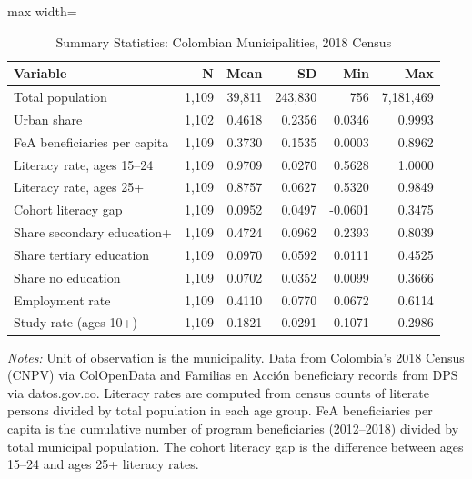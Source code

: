 \begin{table}[H]
\centering
\caption{Summary Statistics: Colombian Municipalities, 2018 Census}
\label{tab:summary}
\begin{threeparttable}
\begin{adjustbox}{max width=\textwidth}
\begin{tabular}{lrrrrr}
\toprule
Variable & N & Mean & SD & Min & Max \\
\midrule
Total population & 1,109 & 39,811 & 243,830 & 756 & 7,181,469 \\
Urban share & 1,102 & 0.4618 & 0.2356 & 0.0346 & 0.9993 \\
FeA beneficiaries per capita & 1,109 & 0.3730 & 0.1535 & 0.0003 & 0.8962 \\
Literacy rate, ages 15--24 & 1,109 & 0.9709 & 0.0270 & 0.5628 & 1.0000 \\
Literacy rate, ages 25+ & 1,109 & 0.8757 & 0.0627 & 0.5320 & 0.9849 \\
Cohort literacy gap & 1,109 & 0.0952 & 0.0497 & -0.0601 & 0.3475 \\
Share secondary education+ & 1,109 & 0.4724 & 0.0962 & 0.2393 & 0.8039 \\
Share tertiary education & 1,109 & 0.0970 & 0.0592 & 0.0111 & 0.4525 \\
Share no education & 1,109 & 0.0702 & 0.0352 & 0.0099 & 0.3666 \\
Employment rate & 1,109 & 0.4110 & 0.0770 & 0.0672 & 0.6114 \\
Study rate (ages 10+) & 1,109 & 0.1821 & 0.0291 & 0.1071 & 0.2986 \\
\bottomrule
\end{tabular}
\end{adjustbox}
\begin{tablenotes}[flushleft]
\small
\item \textit{Notes:} Unit of observation is the municipality. Data from Colombia's 2018 Census (CNPV) via ColOpenData and Familias en Acci\'{o}n beneficiary records from DPS via datos.gov.co. Literacy rates are computed from census counts of literate persons divided by total population in each age group. FeA beneficiaries per capita is the cumulative number of program beneficiaries (2012--2018) divided by total municipal population. The cohort literacy gap is the difference between ages 15--24 and ages 25+ literacy rates.
\end{tablenotes}
\end{threeparttable}
\end{table}
